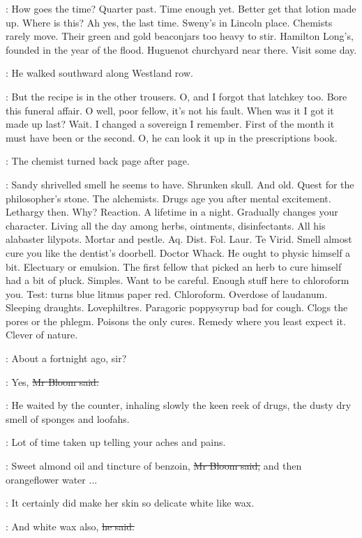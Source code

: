 \BloomInt:
How goes the time?
Quarter past.
Time enough yet.
Better get that lotion made up.
Where is this?
Ah yes, the last time.
Sweny's in Lincoln place.
Chemists rarely move.
Their green and gold beaconjars too heavy to stir.
Hamilton Long's, founded in the year of the flood.
Huguenot churchyard near there.
Visit some day.

:
He walked southward along Westland row.

\BloomInt:
But the recipe is in the other trousers.
O, and I forgot that latchkey too.
Bore
this funeral affair.
O well, poor fellow,
it's not his fault.
When was it I got it made up last?
Wait.
I changed a sovereign I remember.
First of the month it must have been
or the second.
O, he can look it up in the prescriptions book.

:
The chemist turned back page after page.

\BloomInt:
Sandy shrivelled smell he seems to have.
Shrunken skull.
And old.
Quest for the philosopher's stone.
The alchemists.
Drugs age you after mental excitement.
Lethargy then.
Why?
Reaction.
A lifetime in a night.
Gradually changes your character.
Living all the day among herbs, ointments, disinfectants.
All his alabaster lilypots.
Mortar and pestle.
Aq.
Dist.
Fol.
Laur.
Te Virid.
Smell almost cure you like the dentist's doorbell.
Doctor Whack.
He ought to physic himself a bit.
Electuary or emulsion.
The first fellow that picked an herb to cure himself had a bit of pluck.
Simples.
Want to be
careful.
Enough stuff here to chloroform you.
Test: turns blue litmus paper red.
Chloroform.
Overdose of laudanum.
Sleeping draughts.
Lovephiltres.
Paragoric poppysyrup bad for cough.
Clogs the pores or the phlegm.
Poisons the only cures.
Remedy where you least expect it.
Clever of nature.

\sweny:
About a fortnight ago, sir?

\Bloom:
Yes,
\sout{Mr Bloom said.}

:
He waited by the counter,
inhaling slowly the keen reek of drugs,
the dusty dry smell of sponges and loofahs.

\BloomInt:
Lot of time taken up telling your
aches and pains.

\Bloom:
Sweet almond oil and tincture of benzoin,
\sout{Mr Bloom said,}
and then orangeflower water ...

\BloomInt:
It certainly did make her skin so delicate white like wax.

\Bloom:
And white wax also,
\sout{he said.}

